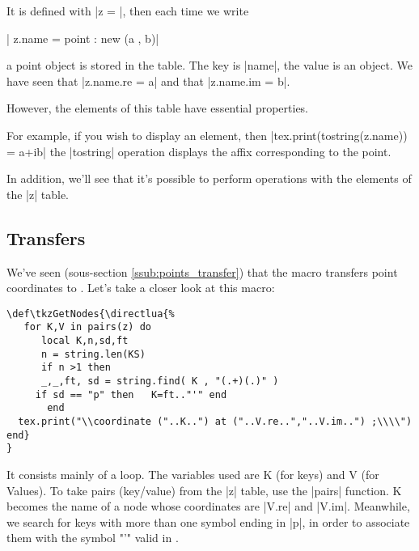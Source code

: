 It is defined with |z = {}|, then each time we write

\begin{mybox}
   | z.name = point : new (a , b)|
\end{mybox}

a point object is stored in the table. The key is |name|, the value is an object. We have seen that |z.name.re = a| and that |z.name.im = b|.

However, the elements of this table have essential properties.

For example, if you wish to display an element, then |tex.print(tostring(z.name)) = a+ib| the |tostring| operation displays the affix corresponding to the point.

In addition, we'll see that it's possible to perform operations with the elements of the |z| table.

\subsection{Transfers} %
\label{sub:transfers}

We've seen (sous-section \ref{ssub:points_transfer}) that the macro  transfers point coordinates to \TIKZ. Let's take a closer look at this macro:

\vspace*{1em}

\begin{mybox}
\begin{Verbatim}
\def\tkzGetNodes{\directlua{%
   for K,V in pairs(z) do
      local K,n,sd,ft
      n = string.len(KS)
      if n >1 then
      _,_,ft, sd = string.find( K , "(.+)(.)" )  
     if sd == "p" then   K=ft.."'" end  
       end    
  tex.print("\\coordinate ("..K..") at ("..V.re..","..V.im..") ;\\\\")
end}
}
\end{Verbatim}
\end{mybox}

It consists mainly of a loop. The variables used are K (for keys) and V (for Values). To take pairs (key/value) from the |z| table, use the |pairs| function. K becomes the name of a node whose coordinates are |V.re| and |V.im|. Meanwhile, we search for keys with more than one symbol ending in |p|, in order to associate them with the symbol "'" valid in \TIKZ{}.

